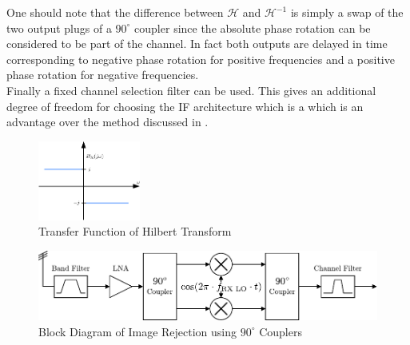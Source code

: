 One should note that the difference between $\mathcal{H}$ and $\mathcal{H}^{-1}$
is simply a swap of the two output plugs of a $90^\circ$ coupler since
the absolute phase rotation can be considered to be part of the channel.
In fact both outputs are delayed in time corresponding to negative phase
rotation for positive frequencies and a positive phase rotation for negative
frequencies. \\

Finally a fixed channel selection filter can be used. This gives an additional
degree of freedom for choosing the \gls{IF} architecture which is a
which is an advantage over the method discussed in . \\

\begin{figure}[h!]
  \centering
  \includegraphics[width=0.3\textwidth]{figures/hilbert}
  \caption{Transfer Function of Hilbert Transform}
  \label{fig:hilbert}
\end{figure}

\begin{figure}[p]
  \centering
  \includegraphics[width=\textwidth]{figures/rx_rf_1_bd}
  \caption{Block Diagram of Image Rejection using $90^\circ$ Couplers}
  \label{fig:rx_rf_1_bd}
\end{figure}

